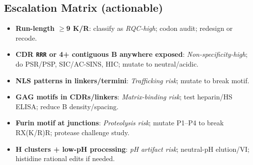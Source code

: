 \subsection*{Escalation Matrix (actionable)}
\begin{itemize}\setlength\itemsep{2pt}
\item \textbf{Run-length $\ge$9 K/R}: classify as \textit{RQC-high}; codon audit; redesign or recode.
\item \textbf{CDR \texttt{RRR} or 4+ contiguous B anywhere exposed}: \textit{Non-specificity-high}; do PSR/PSP, SIC/AC-SINS, HIC; mutate to neutral/acidic.
\item \textbf{NLS patterns in linkers/termini}: \textit{Trafficking risk}; mutate to break motif.
\item \textbf{GAG motifs in CDRs/linkers}: \textit{Matrix-binding risk}; test heparin/HS ELISA; reduce B density/spacing.
\item \textbf{Furin motif at junctions}: \textit{Proteolysis risk}; mutate P1–P4 to break RX(K/R)R; protease challenge study.
\item \textbf{H clusters + low-pH processing}: \textit{pH artifact risk}; neutral-pH elution/VI; histidine rational edits if needed.
\end{itemize}

